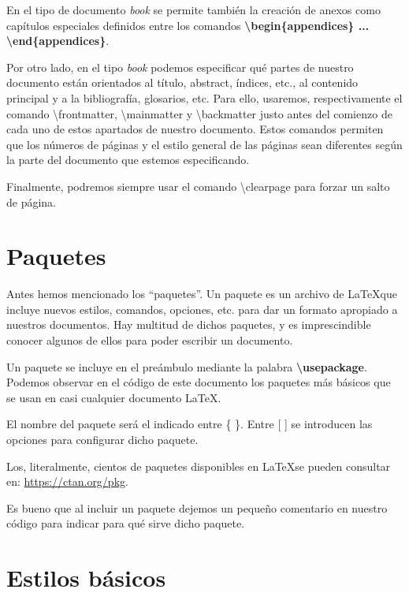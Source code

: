 \documentclass[12pt]{book} %
\begin{document}
En el tipo de documento \emph{book} se permite también la creación de anexos como capítulos especiales definidos entre los comandos \textbf{\textbackslash begin\{appendices\} ... \textbackslash end\{appendices\}}.

Por otro lado, en el tipo \emph{book} podemos especificar qué partes de nuestro documento están orientados al título, abstract, índices, etc., al contenido principal y a la bibliografía, glosarios, etc. Para ello, usaremos, respectivamente el comando \textbackslash frontmatter, \textbackslash mainmatter y \textbackslash backmatter justo antes del comienzo de cada uno de estos apartados de nuestro documento. Estos comandos permiten que los números de páginas y el estilo general de las páginas sean diferentes según la parte del documento que estemos especificando.

Finalmente, podremos siempre usar el comando \textbackslash clearpage para forzar un salto de página.

\section{Paquetes}

Antes hemos mencionado los ``paquetes''. Un paquete es un archivo de \LaTeX que incluye nuevos estilos, comandos, opciones, etc. para dar un formato apropiado a nuestros documentos. Hay multitud de dichos paquetes, y es imprescindible conocer algunos de ellos para poder escribir un documento.

Un paquete se incluye en el preámbulo mediante la palabra \textbf{\textbackslash usepackage}. Podemos observar en el código de este documento los paquetes más básicos que se usan en casi cualquier documento \LaTeX. 

El nombre del paquete será el indicado entre \{ \}.  Entre [ ] se introducen las opciones para configurar dicho paquete.

Los, literalmente, cientos de paquetes disponibles en \LaTeX se pueden consultar en: \url{https://ctan.org/pkg}.


Es bueno que al incluir un paquete dejemos un pequeño comentario en nuestro código para indicar para qué sirve dicho paquete.

\section{Estilos básicos}
\end{document}
